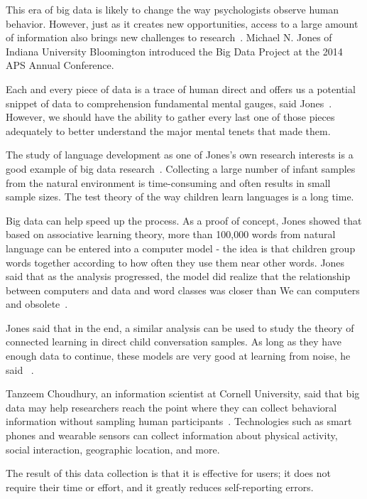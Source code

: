 This era of big data is likely to change the way psychologists 
observe human behavior. However, just as it creates new 
opportunities, access to a large amount of information also brings
 new challenges to research~\cite{editor00}. Michael N. Jones of 
Indiana University Bloomington introduced the Big Data Project at 
the 2014 APS Annual Conference.

Each and every piece of data is a trace of human direct and 
offers us a potential snippet of data to comprehension 
fundamental mental gauges, said Jones~\cite{editor00}. 
However, we should have the ability to gather every last one of 
those pieces adequately to better understand the major mental 
tenets that made them.

The study of language development as one of Jones's own research 
interests is a good example of big data research~\cite{editor00}. 
Collecting a large number of infant samples from the natural 
environment is time-consuming and often results in small sample 
sizes. The test theory of the way children learn languages is a 
long time.

Big data can help speed up the process. As a proof of concept, 
Jones showed that based on associative learning theory, more than 
100,000 words from natural language can be entered into a computer
 model - the idea is that children group words together according 
to how often they use them near other words. 
Jones said that as the
 analysis progressed, the model did realize that the relationship 
between computers and data and word classes was closer than We can 
computers and obsolete~\cite{editor00}.

Jones said that in the end, a similar analysis can be used to study
 the theory of connected learning in direct child conversation 
samples. As long as they have enough data to continue, these 
models are very good at learning from noise, he said
~\cite{editor00}.

Tanzeem Choudhury, an information scientist at Cornell University, 
said that big data may help researchers reach the point where they 
can collect behavioral information without sampling human 
participants~\cite{editor00}. Technologies such as smart phones and
 wearable sensors can collect information about physical activity,
 social interaction, geographic location, and more.

The result of this data collection is that it is effective for 
users; it does not require their time or effort, and it greatly 
reduces self-reporting errors.

